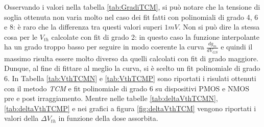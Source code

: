 Osservando i valori nella tabella \ref{tab:GradiTCM}, si può notare che la tensione di soglia ottenuta non varia molto nel caso dei fit fatti con polinomiali di grado 4, 6 e 8: è raro che la differenza tra questi valori superi $1 mV$. Non si può dire la stessa cosa per le $V_{th}$ calcolate con fit di grado 2: in questo caso la funzione interpolante ha un grado troppo basso per seguire in modo coerente la curva $\frac{dg_m}{dV_{GS}}$ e quindi il massimo risulta essere molto diverso da quelli calcolati con fit di grado maggiore. Dunque, al fine di fittare al meglio la curva, si è scelto un fit polinomiale di grado 6. In Tabella \ref{tab:VthTCMN} e \ref{tab:VthTCMP} sono riportati i risulati ottenuti con il metodo \emph{TCM} e fit polinomiale di grado 6 su dispositivi PMOS e NMOS pre e post irraggiamento.
Mentre nelle tabelle \ref{tab:deltaVthTCMN}, \ref{tab:deltaVthTCMP} e nei grafici a figura \ref{fig:deltaVthTCM} vengono riportati i valori della $\Delta V_{th}$ in funzione della dose assorbita.


